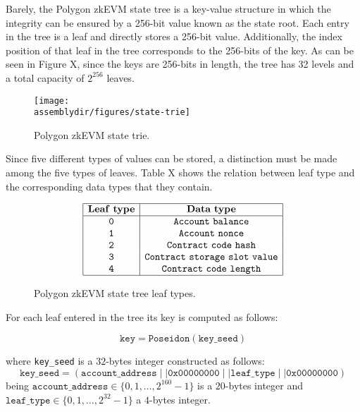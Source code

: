 Barely, the Polygon zkEVM state tree is a key-value structure in which the integrity can be ensured by a 256-bit value known as the state root. Each entry in the tree is a leaf and directly stores a 256-bit value. Additionally, the index position of that leaf in the tree corresponds to the 256-bits of the key. As can be seen in Figure X, since the keys are 256-bits in length, the tree has 32 levels and a total capacity of $2^{256}$ leaves.


\begin{figure}[H]
    \centering
    \texttt{[image: \\assemblydir/figures/state-trie]}
    \caption{Polygon zkEVM state trie.}
    \label{fig:hashk-add-bytes}
\end{figure}

Since five different types of values can be stored, a distinction must be made among the five types of leaves. Table X shows the relation between leaf type and the corresponding data types that they contain.

\begin{figure}[h!]
    \renewcommand{\figurename}{Table}
    \[
    \begin{array}{|c|c|}
        \hline
        \mathbf{Leaf~type} &\mathbf{Data~type} \\ \hline
        \mathtt{0} & \mathtt{Account~balance} \\
        \mathtt{1} & \mathtt{Account~nonce} \\
        \mathtt{2} & \mathtt{Contract~code~hash} \\
        \mathtt{3} & \mathtt{Contract~storage~slot~value} \\
        \mathtt{4} & \mathtt{Contract~code~length} \\
        \hline
    \end{array}
    \]
    \caption{Polygon zkEVM state tree leaf types.}
    \label{tab:memory-first-example}
\end{figure}


For each leaf entered in the tree its key is computed as follows:

$$\texttt{key} = \texttt{Poseidon}(\texttt{key\_seed})$$

where \texttt{key\_seed} is a $32$-bytes integer constructed as follows:
\[
\texttt{key\_seed} = (\texttt{account\_address} \mid\mid \texttt{0x00000000} \mid\mid \texttt{leaf\_type} \mid\mid \texttt{0x00000000})
\]
being $\texttt{account\_address} \in \{0, 1, \dots, 2^{160} - 1\}$ is a $20$-bytes integer and $\texttt{leaf\_type} \in \{0, 1, \dots, 2^{32} - 1\}$ a $4$-bytes integer.

